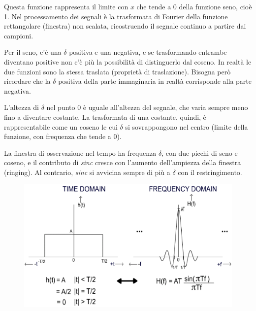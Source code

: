 Questa funzione rappresenta il limite con $x$ che tende a 0 della funzione seno, cioè 1. Nel processamento dei segnali è la trasformata di Fourier della funzione rettangolare (finestra) non scalata, ricostruendo il segnale continuo a partire dai campioni.

Per il seno, c'è una $\delta$ positiva e una negativa, e se trasformando entrambe diventano positive non c'è più la possibilità di distinguerlo dal coseno. In realtà le due funzioni sono la stessa traslata (proprietà di traslazione). Bisogna però ricordare che la $\delta$ positiva della parte immaginaria in realtà corrisponde alla parte negativa.

L'altezza di $\delta$ nel punto 0 è uguale all'altezza del segnale, che varia sempre meno fino a diventare costante. La trasformata di una costante, quindi, è rappresentabile come un coseno le cui $\delta$ si sovrappongono nel centro (limite della funzione, con frequenza che tende a 0).

La finestra di osservazione nel tempo ha frequenza $\delta$, con due picchi di seno e coseno, e il contributo di \textit{sinc} cresce con l'aumento dell'ampiezza della finestra (ringing). Al contrario, \textit{sinc} si avvicina sempre di più a $\delta$ con il restringimento.

\begin{figure}[h]
	\centering
	\includegraphics[scale=0.6]{Lezioni/Immagini/finestra_sinc}
\end{figure}
